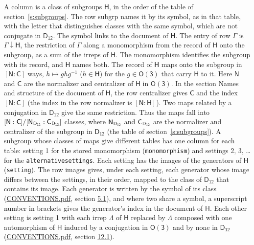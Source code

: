 \documentclass[10pt,a4paper]{article}
\numberwithin{equation}{section}
\newcommand{\grp}[1]{\mathsf{#1}}
\newcommand{\grpindex}[2]{[#1 : #2]}
\newcommand{\restr}[2]{#1\!\downarrow#2}
\newcommand{\hairsp}{\mkern1mu}
\begin{document}
A column is a class of subgroups $\grp{H}$, in the order of the table of section~\ref{s:subgroups}. The row subgrp names it by its symbol, as in that table, with the letter that distinguishes classes with the same symbol, which are not conjugate in $\grp{D_{12}}$. The symbol links to the document of $\grp{H}$. The entry of row $\Gamma$ is $\restr{\Gamma}{\grp{H}}$, the restriction of $\Gamma$ along a monomorphism from the record of $\grp{H}$ onto the subgroup, as a sum of the irreps of $\grp{H}$. The monomorphism identifies the subgroup with its record, and $\grp{H}$ names both. \label{n:group.normalizer.o3}\label{n:group.centralizer.o3}The record of $\grp{H}$ maps onto the subgroup in $\grpindex{\grp{N}}{\grp{C}}$ ways, $h \mapsto g h g^{-1}$ ($h \in \grp{H}$) for the $g \in \grp{O(3)}$ that carry $\grp{H}$ to it. Here $\grp{N}$ and $\grp{C}$ are the normalizer and centralizer of $\grp{H}$ in \href{O3.pdf}{$\grp{O(3)}$}. In the section Names and structure of the document of $\grp{H}$, the row centralizer gives $\grp{C}$ and the index $\grpindex{\grp{N}}{\grp{C}}$ (the index in the row normalizer is $\grpindex{\grp{N}}{\grp{H}}$). Two maps related by a conjugation in $\grp{D_{12}}$ give the same restriction. Thus the maps fall into $\grpindex{\grp{N}}{\grp{C}}/\grpindex{\grp{N}_{\hairsp \grp{D_{12}}}}{\grp{C}_{\hairsp \grp{D_{12}}}}$ classes, where $\grp{N}_{\hairsp \grp{D_{12}}}$ and $\grp{C}_{\hairsp \grp{D_{12}}}$ are the normalizer and centralizer of the subgroup in $\grp{D_{12}}$ (the table of section~\ref{s:subgroups}). \label{n:head.setting}A subgroup whose classes of maps give different tables has one column for each table: setting 1 for the stored monomorphism (\texttt{monomorphism}) and settings 2, 3, \dots{} for the \texttt{alternativesettings}. Each setting has the images of the generators of $\grp{H}$ (\texttt{setting}). \label{n:head.images}The row images gives, under each setting, each generator whose image differs between the settings, in their order, mapped to the class of $\grp{D_{12}}$ that contains its image. \label{n:element.generator.index}Each generator is written by the symbol of its class (\href{../../CONVENTIONS.pdf}{CONVENTIONS.pdf}, section \href{../../CONVENTIONS.pdf\#conv.5.1}{5.1}), and where two share a symbol, a superscript number in brackets gives the generator's index in the document of $\grp{H}$. \label{n:irrep.Delta}Each other setting is setting 1 with each irrep $\Lambda$ of $\grp{H}$ replaced by $\Lambda$ composed with one automorphism of $\grp{H}$ induced by a conjugation in \href{O3.pdf}{$\grp{O(3)}$} and by none in $\grp{D_{12}}$ (\href{../../CONVENTIONS.pdf}{CONVENTIONS.pdf}, section \href{../../CONVENTIONS.pdf\#conv.12.1}{12.1}).
\end{document}
